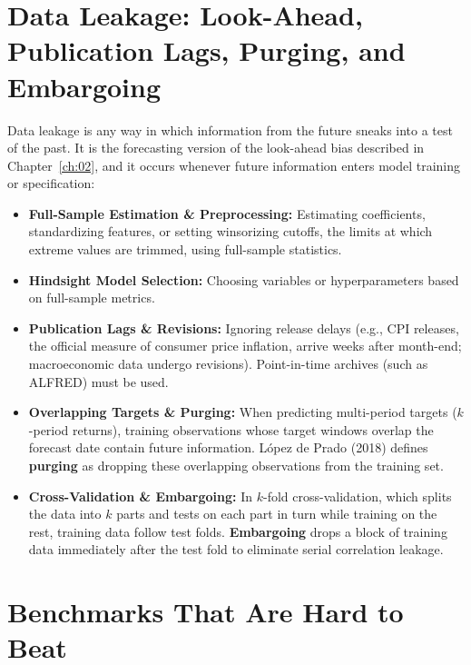 \section{Data Leakage: Look-Ahead, Publication Lags, Purging, and Embargoing}
\label{sec:09-leakage}

Data leakage is any way in which information from the future sneaks into a test of the past. It is the forecasting version of the look-ahead bias described in Chapter~\ref{ch:02}, and it occurs whenever future information enters model training or specification:
\begin{itemize}
  \item \textbf{Full-Sample Estimation \& Preprocessing:} Estimating coefficients, standardizing features, or setting winsorizing cutoffs, the limits at which extreme values are trimmed, using full-sample statistics.
  \item \textbf{Hindsight Model Selection:} Choosing variables or hyperparameters based on full-sample metrics.
  \item \textbf{Publication Lags \& Revisions:} Ignoring release delays (e.g., CPI releases, the official measure of consumer price inflation, arrive weeks after month-end; macroeconomic data undergo revisions). Point-in-time archives (such as ALFRED) must be used.
  \item \textbf{Overlapping Targets \& Purging:} When predicting multi-period targets ($k$-period returns), training observations whose target windows overlap the forecast date contain future information. López de Prado (2018) defines \textbf{purging} as dropping these overlapping observations from the training set.
  \item \textbf{Cross-Validation \& Embargoing:} In $k$-fold cross-validation, which splits the data into $k$ parts and tests on each part in turn while training on the rest, training data follow test folds. \textbf{Embargoing} drops a block of training data immediately after the test fold to eliminate serial correlation leakage.
\end{itemize}

\section{Benchmarks That Are Hard to Beat}
\label{sec:09-benchmarks}

